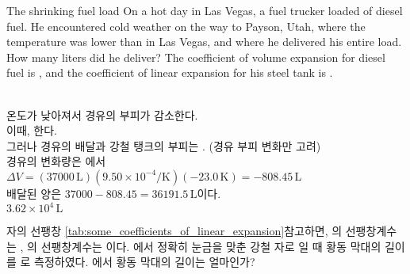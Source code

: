 \begin{practicebox}{The shrinking fuel load}
On a hot day in Las Vegas, a fuel trucker loaded 
of diesel fuel. He encountered cold weather on the way to
Payson, Utah, where the temperature was  lower
than in Las Vegas, and where he delivered his entire load.
How many liters did he deliver? The coefficient of volume expansion
for diesel fuel is ,
and the coefficient of linear expansion for his steel tank is
. \\\vspace{-12pt}%
%
\end{practicebox}

\begin{solbox}
\bnset
{} \\
\bn 온도가 낮아져서 경유의 부피가 감소한다. \\
\bns 이때, 한다. \\
\bns 그러나 경유의 배달과 강철 탱크의 부피는 .
(경유 부피 변화만 고려) \\
\bn 경유의 변화량은 에서 \\
\bns $\Delta V = (\num{37000}\,\mathrm{L})(9.50 \times 10^{-4}/\mathrm{K})(-23.0\,\mathrm{K}) = -808.45\,\mathrm{L}$ \\
\bn 배달된 양은 $\num{37000} - 808.45 = \num{36191.5}\,\mathrm{L}$이다. \\
 $3.62 \times 10^4 \,\mathrm{L}$
\end{solbox}
\clearpage



\begin{practicebox*}{자의 선팽창}
\autoref{tab:some_coefficients_of_linear_expansion}\을 참고하면,
의 선팽창계수는 ,
의 선팽창계수는 이다.
에서 정확히 눈금을 맞춘 강철 자로
일 때 황동 막대의 길이를
로 측정하였다.
에서 황동 막대의 길이는 얼마인가?
\end{practicebox*}
\vspace{3cm}%

